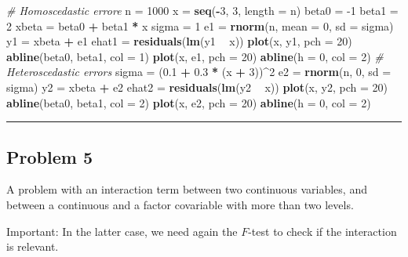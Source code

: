 \documentclass[]{article}
\newenvironment{Shaded}{\begin{snugshade}}{\end{snugshade}}
\newcommand{\KeywordTok}[1]{\textcolor[rgb]{0.13,0.29,0.53}{\textbf{#1}}}
\newcommand{\DataTypeTok}[1]{\textcolor[rgb]{0.13,0.29,0.53}{#1}}
\newcommand{\DecValTok}[1]{\textcolor[rgb]{0.00,0.00,0.81}{#1}}
\newcommand{\FloatTok}[1]{\textcolor[rgb]{0.00,0.00,0.81}{#1}}
\newcommand{\StringTok}[1]{\textcolor[rgb]{0.31,0.60,0.02}{#1}}
\newcommand{\CommentTok}[1]{\textcolor[rgb]{0.56,0.35,0.01}{\textit{#1}}}
\newcommand{\OperatorTok}[1]{\textcolor[rgb]{0.81,0.36,0.00}{\textbf{#1}}}
\newcommand{\NormalTok}[1]{#1}
\begin{document}
\begin{Shaded}
\begin{Highlighting}[]
\CommentTok{# Homoscedastic errore}
\NormalTok{n =}\StringTok{ }\DecValTok{1000}
\NormalTok{x =}\StringTok{ }\KeywordTok{seq}\NormalTok{(}\OperatorTok{-}\DecValTok{3}\NormalTok{, }\DecValTok{3}\NormalTok{, }\DataTypeTok{length =}\NormalTok{ n)}
\NormalTok{beta0 =}\StringTok{ }\DecValTok{-1}
\NormalTok{beta1 =}\StringTok{ }\DecValTok{2}
\NormalTok{xbeta =}\StringTok{ }\NormalTok{beta0 }\OperatorTok{+}\StringTok{ }\NormalTok{beta1 }\OperatorTok{*}\StringTok{ }\NormalTok{x}
\NormalTok{sigma =}\StringTok{ }\DecValTok{1}
\NormalTok{e1 =}\StringTok{ }\KeywordTok{rnorm}\NormalTok{(n, }\DataTypeTok{mean =} \DecValTok{0}\NormalTok{, }\DataTypeTok{sd =}\NormalTok{ sigma)}
\NormalTok{y1 =}\StringTok{ }\NormalTok{xbeta }\OperatorTok{+}\StringTok{ }\NormalTok{e1}
\NormalTok{ehat1 =}\StringTok{ }\KeywordTok{residuals}\NormalTok{(}\KeywordTok{lm}\NormalTok{(y1 }\OperatorTok{~}\StringTok{ }\NormalTok{x))}
\KeywordTok{plot}\NormalTok{(x, y1, }\DataTypeTok{pch =} \DecValTok{20}\NormalTok{)}
\KeywordTok{abline}\NormalTok{(beta0, beta1, }\DataTypeTok{col =} \DecValTok{1}\NormalTok{)}
\KeywordTok{plot}\NormalTok{(x, e1, }\DataTypeTok{pch =} \DecValTok{20}\NormalTok{)}
\KeywordTok{abline}\NormalTok{(}\DataTypeTok{h =} \DecValTok{0}\NormalTok{, }\DataTypeTok{col =} \DecValTok{2}\NormalTok{)}
\CommentTok{# Heteroscedastic errors}
\NormalTok{sigma =}\StringTok{ }\NormalTok{(}\FloatTok{0.1} \OperatorTok{+}\StringTok{ }\FloatTok{0.3} \OperatorTok{*}\StringTok{ }\NormalTok{(x }\OperatorTok{+}\StringTok{ }\DecValTok{3}\NormalTok{))}\OperatorTok{^}\DecValTok{2}
\NormalTok{e2 =}\StringTok{ }\KeywordTok{rnorm}\NormalTok{(n, }\DecValTok{0}\NormalTok{, }\DataTypeTok{sd =}\NormalTok{ sigma)}
\NormalTok{y2 =}\StringTok{ }\NormalTok{xbeta }\OperatorTok{+}\StringTok{ }\NormalTok{e2}
\NormalTok{ehat2 =}\StringTok{ }\KeywordTok{residuals}\NormalTok{(}\KeywordTok{lm}\NormalTok{(y2 }\OperatorTok{~}\StringTok{ }\NormalTok{x))}
\KeywordTok{plot}\NormalTok{(x, y2, }\DataTypeTok{pch =} \DecValTok{20}\NormalTok{)}
\KeywordTok{abline}\NormalTok{(beta0, beta1, }\DataTypeTok{col =} \DecValTok{2}\NormalTok{)}
\KeywordTok{plot}\NormalTok{(x, e2, }\DataTypeTok{pch =} \DecValTok{20}\NormalTok{)}
\KeywordTok{abline}\NormalTok{(}\DataTypeTok{h =} \DecValTok{0}\NormalTok{, }\DataTypeTok{col =} \DecValTok{2}\NormalTok{)}
\end{Highlighting}
\end{Shaded}

\begin{center}\rule{0.5\linewidth}{\linethickness}\end{center}

\subsection{Problem 5}\label{problem-5}

A problem with an interaction term between two continuous variables, and
between a continuous and a factor covariable with more than two levels.

Important: In the latter case, we need again the \(F\)-test to check if
the interaction is relevant.
\end{document}
